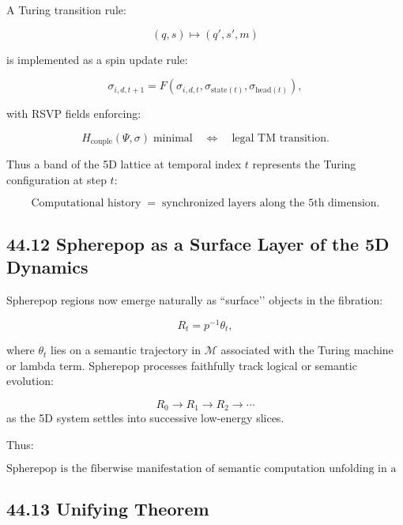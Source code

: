 \documentclass[12pt,letterpaper]{article}
\theoremstyle{remark}
\begin{document}
A Turing transition rule:

\[
(q, s) \mapsto (q', s', m)
\]

is implemented as a spin update rule:

\[
\sigma_{i,d,t+1} = F(\sigma_{i,d,t}, \sigma_{\text{state}(t)}, \sigma_{\text{head}(t)}),
\]

with RSVP fields enforcing:

\[
H_{\text{couple}}(\Psi, \sigma) 
\; \text{minimal} 
\quad\Longleftrightarrow\quad
\text{legal TM transition}.
\]

Thus a band of the 5D lattice at temporal index $t$ represents the Turing configuration at step $t$:

\[
\boxed{
\text{Computational history} \;=\; \text{synchronized layers along the 5th dimension}.
}
\]

\subsection{44.12 Spherepop as a Surface Layer of the 5D Dynamics}

Spherepop regions now emerge naturally as ``surface’’ objects in the fibration:

\[
R_t = p^{-1}\theta_t,
\]

where $\theta_t$ lies on a semantic trajectory in $\mathcal{M}$ associated with the Turing machine or lambda term. Spherepop processes faithfully track logical or semantic evolution:

\[
R_0 \to R_1 \to R_2 \to \cdots
\]
as the 5D system settles into successive low-energy slices.

Thus:

\[
\boxed{
\text{Spherepop is the fiberwise manifestation of semantic computation
unfolding in a higher-dimensional RSVP–Ising manifold.}
}
\]

\subsection{44.13 Unifying Theorem}
\end{document}
